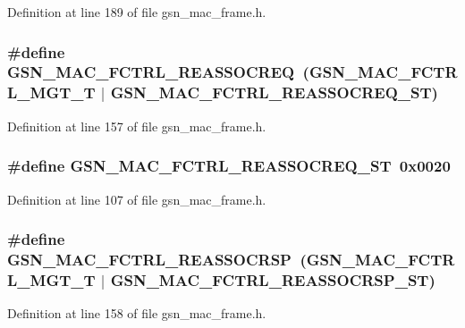 Definition at line 189 of file gsn\_\-mac\_\-frame.h.

\hypertarget{a00523_a4b8e47007b45e0ce256f39fc30fcb1e3}{
\subsubsection[{GSN\_\-MAC\_\-FCTRL\_\-REASSOCREQ}]{\setlength{\rightskip}{0pt plus 5cm}\#define GSN\_\-MAC\_\-FCTRL\_\-REASSOCREQ~(GSN\_\-MAC\_\-FCTRL\_\-MGT\_\-T     $|$ GSN\_\-MAC\_\-FCTRL\_\-REASSOCREQ\_\-ST)}}
\label{a00523_a4b8e47007b45e0ce256f39fc30fcb1e3}


Definition at line 157 of file gsn\_\-mac\_\-frame.h.

\hypertarget{a00523_a70de5711418ecf23ece9583c3c467f5a}{
\subsubsection[{GSN\_\-MAC\_\-FCTRL\_\-REASSOCREQ\_\-ST}]{\setlength{\rightskip}{0pt plus 5cm}\#define GSN\_\-MAC\_\-FCTRL\_\-REASSOCREQ\_\-ST~0x0020}}
\label{a00523_a70de5711418ecf23ece9583c3c467f5a}


Definition at line 107 of file gsn\_\-mac\_\-frame.h.

\hypertarget{a00523_ae0a942b0d0814b5372759a6150f52258}{
\subsubsection[{GSN\_\-MAC\_\-FCTRL\_\-REASSOCRSP}]{\setlength{\rightskip}{0pt plus 5cm}\#define GSN\_\-MAC\_\-FCTRL\_\-REASSOCRSP~(GSN\_\-MAC\_\-FCTRL\_\-MGT\_\-T     $|$ GSN\_\-MAC\_\-FCTRL\_\-REASSOCRSP\_\-ST)}}
\label{a00523_ae0a942b0d0814b5372759a6150f52258}


Definition at line 158 of file gsn\_\-mac\_\-frame.h.

